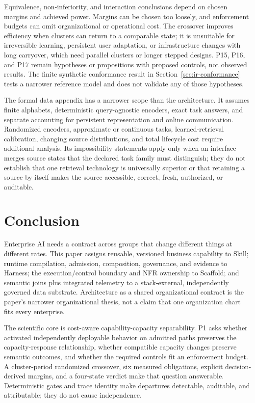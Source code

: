 \documentclass[11pt]{article}
\begin{document}
Equivalence, non-inferiority, and interaction conclusions depend on chosen margins and achieved power. Margins can be chosen too loosely, and enforcement budgets can omit organizational or operational cost. The crossover improves efficiency when clusters can return to a comparable state; it is unsuitable for irreversible learning, persistent user adaptation, or infrastructure changes with long carryover, which need parallel clusters or longer stepped designs. P15, P16, and P17 remain hypotheses or propositions with proposed controls, not observed results. The finite synthetic conformance result in Section~\ref{sec:ir-conformance} tests a narrower reference model and does not validate any of those hypotheses.

The formal data appendix has a narrower scope than the architecture. It assumes finite alphabets, deterministic query-agnostic encoders, exact task answers, and separate accounting for persistent representation and online communication. Randomized encoders, approximate or continuous tasks, learned-retrieval calibration, changing source distributions, and total lifecycle cost require additional analysis. Its impossibility statements apply only when an interface merges source states that the declared task family must distinguish; they do not establish that one retrieval technology is universally superior or that retaining a source by itself makes the source accessible, correct, fresh, authorized, or auditable.

\section{Conclusion}
\label{sec:conclusion}

Enterprise AI needs a contract across groups that change different things at different rates. This paper assigns reusable, versioned business capability to Skill; runtime compilation, admission, composition, governance, and evidence to Harness; the execution/control boundary and NFR ownership to Scaffold; and semantic joins plus integrated telemetry to a stack-external, independently governed data substrate. Architecture as a shared organizational contract is the paper's narrower organizational thesis, not a claim that one organization chart fits every enterprise.

The scientific core is cost-aware capability-capacity separability. P1 asks whether activated independently deployable behavior on admitted paths preserves the capacity-response relationship, whether compatible capacity changes preserve semantic outcomes, and whether the required controls fit an enforcement budget. A cluster-period randomized crossover, six measured obligations, explicit decision-derived margins, and a four-state verdict make that question answerable. Deterministic gates and trace identity make departures detectable, auditable, and attributable; they do not cause independence.
\end{document}
